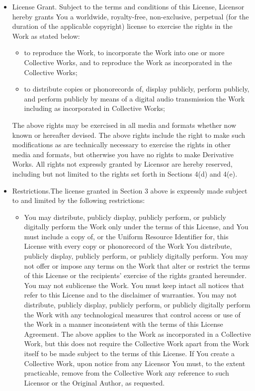 \begin{itemize}
\item License Grant.  Subject to the terms and conditions of this
License, Licensor hereby grants You a worldwide, royalty-free,
non-exclusive, perpetual (for the duration of the applicable
copyright) license to exercise the rights in the Work as stated below:

\begin{itemize} \item to reproduce the Work, to incorporate the Work
into one or more Collective Works, and to reproduce the Work as
incorporated in the Collective Works;

\item to distribute copies or phonorecords of, display publicly,
perform publicly, and perform publicly by means of a digital audio
transmission the Work including as incorporated in Collective
Works;\end{itemize}

The above rights may be exercised in all media and formats whether now
known or hereafter devised.  The above rights include the right to
make such modifications as are technically necessary to exercise the
rights in other media and formats, but otherwise you have no rights to
make Derivative Works.  All rights not expressly granted by Licensor
are hereby reserved, including but not limited to the rights set forth
in Sections 4(d) and 4(e).

\item Restrictions.The license granted in Section 3 above is expressly
made subject to and limited by the following restrictions:

\begin{itemize} \item You may distribute, publicly display, publicly
perform, or publicly digitally perform the Work only under the terms
of this License, and You must include a copy of, or the Uniform
Resource Identifier for, this License with every copy or phonorecord
of the Work You distribute, publicly display, publicly perform, or
publicly digitally perform.  You may not offer or impose any terms on
the Work that alter or restrict the terms of this License or the
recipients' exercise of the rights granted hereunder.  You may not
sublicense the Work.  You must keep intact all notices that refer to
this License and to the disclaimer of warranties.  You may not
distribute, publicly display, publicly perform, or publicly digitally
perform the Work with any technological measures that control access
or use of the Work in a manner inconsistent with the terms of this
License Agreement.  The above applies to the Work as incorporated in a
Collective Work, but this does not require the Collective Work apart
from the Work itself to be made subject to the terms of this License. 
If You create a Collective Work, upon notice from any Licensor You
must, to the extent practicable, remove from the Collective Work any
reference to such Licensor or the Original Author, as requested.


\end{itemize}
\end{itemize}
